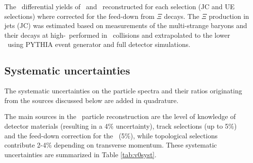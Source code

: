The \pt\ differential yields of \lda\ and \alda\ reconstructed for each selection (JC and UE selections) where corrected for the feed-down from $\Xi$ decays. 
The $\Xi$ production in jets (JC) was estimated based on measurements of the multi-strange baryons and their decays at high-\pt\ performed in \pp\ collisions \cite{Abelev:2012jp} and extrapolated to the lower \pt\ using PYTHIA event generator and full detector simulations.


\subsection{Systematic uncertainties}
\label{sec:uncertainties}


The systematic uncertainties on the particle spectra and their ratios originating from the sources discussed below are added in quadrature.


The main sources in the \Vzero\ particle reconstruction are the level of knowledge of detector materials (resulting in a 4\% uncertainty), track selections (up to 5\%) and the feed-down correction for the \lda\ (5\%), while topological selections contribute 2-4\% depending on transverse momentum. These systematic uncertainties are summarized in Table \ref{tab:v0syst}.

